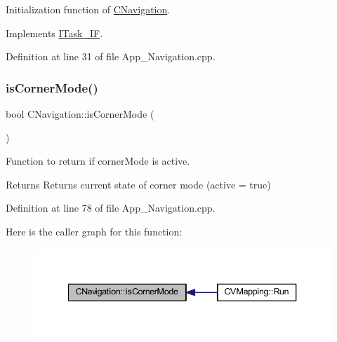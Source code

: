 Initialization function of \mbox{\hyperlink{class_c_navigation}{C\+Navigation}}. 



Implements \mbox{\hyperlink{class_i_task___i_f_a28f608bdb9b19658403f7b9b7421968d}{I\+Task\+\_\+\+IF}}.



Definition at line 31 of file App\+\_\+\+Navigation.\+cpp.

\mbox{\label{class_c_navigation_aa984fc062deefed13a85d866d997de73}} 
\subsubsection{\texorpdfstring{is\+Corner\+Mode()}{isCornerMode()}}
{\footnotesize\ttfamily bool C\+Navigation\+::is\+Corner\+Mode (\begin{DoxyParamCaption}{ }\end{DoxyParamCaption})}



Function to return if corner\+Mode is active. 

\begin{DoxyReturn}{Returns}
Returns current state of corner mode (active = true) 
\end{DoxyReturn}


Definition at line 78 of file App\+\_\+\+Navigation.\+cpp.

Here is the caller graph for this function\+:\nopagebreak
\begin{figure}[H]
\begin{center}
\leavevmode
\includegraphics[width=340pt]{class_c_navigation_aa984fc062deefed13a85d866d997de73_icgraph}
\end{center}
\end{figure}
\mbox{\label{class_c_navigation_a27649dc6324360829d42aea67e88e3ee}} 
